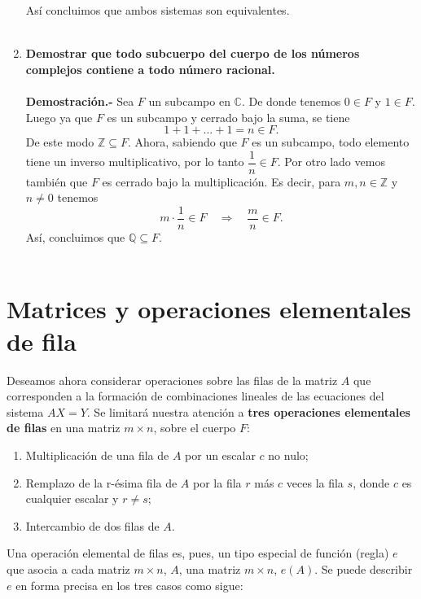 \begin{enumerate}[\bfseries 1.]
	Así concluimos que ambos sistemas son equivalentes.\\\\


    \item \textbf{Demostrar que todo subcuerpo del cuerpo de los números complejos contiene a todo número racional.\\\\
	Demostración.-}\; Sea $F$ un subcampo en $\mathbb{C}$. De donde tenemos $0\in F$ y $1\in F$. Luego ya que $F$ es un subcampo y cerrado bajo la suma, se tiene
	$$1+1+\ldots + 1 = n\in F.$$
	De este modo $\mathbb{Z}\subseteq F$. Ahora, sabiendo que $F$ es un subcampo, todo elemento tiene un inverso multiplicativo, por lo tanto $\dfrac{1}{n}\in F$. Por otro lado vemos también que $F$ es cerrado bajo la multiplicación. Es decir, para $m,n\in \mathbb{Z}$ y $n\neq 0$ tenemos
	$$m\cdot \dfrac{1}{n}\in F\quad \Rightarrow \quad \dfrac{m}{n}\in F.$$
	Así, concluimos que $\mathbb{Q}\subseteq F.$\\\\

\end{enumerate}


\section{Matrices y operaciones elementales de fila}
Deseamos ahora considerar operaciones sobre las filas de la matriz $A$ que corresponden a la formación de combinaciones lineales de las ecuaciones del sistema $AX=Y$. Se limitará nuestra atención a \textbf{tres operaciones elementales de filas} en una matriz $m\times n$, sobre el cuerpo $F$:

\begin{tcolorbox}
    \begin{enumerate}[\bfseries 1.]
	\item Multiplicación de una fila de $A$ por un escalar $c$ no nulo;
	\item Remplazo de la r-ésima fila de $A$ por la fila $r$ más $c$ veces la fila $s$, donde $c$ es cualquier escalar y $r\neq s$;
	\item Intercambio de dos filas de $A$.
    \end{enumerate}
\end{tcolorbox}

Una operación elemental de filas es, pues, un tipo especial de función (regla) $e$ que asocia a cada matriz $m\times n$, $A$, una matriz $m\times n$, $e(A)$. Se puede describir $e$ en forma precisa en los tres casos como sigue:

